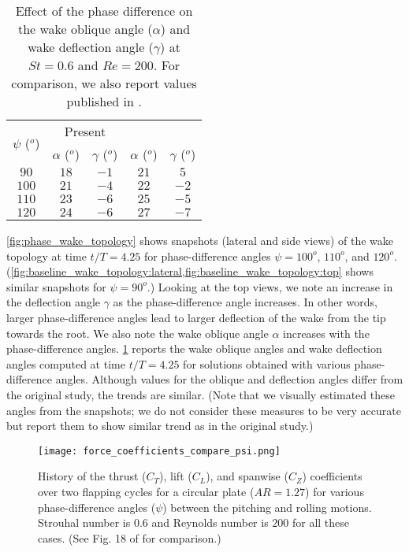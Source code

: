 \begin{table}[!h]
  \centering
  \begin{tabular}{ccccc}
    \hline\hline
    \multirow{2}{*}{$\psi$ ($^o$)} &
      \multicolumn{2}{c}{Present} &
      \multicolumn{2}{c}{\citet{li_dong_2016}} \\
    & $\alpha$ ($^o$) & $\gamma$ ($^o$) & $\alpha$ ($^o$) & $\gamma$ ($^o$) \\
    \hline
    $90$ & $18$ & $-1$ & $21$ & $5$ \\
    $100$ & $21$ & $-4$ & $22$ & $-2$ \\
    $110$ & $23$ & $-6$ & $25$ & $-5$ \\
    $120$ & $24$ & $-6$ & $27$ & $-7$ \\
    \hline\hline
  \end{tabular}
  \caption{Effect of the phase difference on the wake oblique angle ($\alpha$) and wake deflection angle ($\gamma$) at $St = 0.6$ and $Re = 200$. For comparison, we also report values published in \citet{li_dong_2016}.}
  \label{tab:phase_angles}
\end{table}

\cref{fig:phase_wake_topology} shows snapshots (lateral and side views) of the wake topology at time $t/T = 4.25$ for phase-difference angles $\psi = 100^o$, $110^o$, and $120^o$.
(\cref{fig:baseline_wake_topology:lateral,fig:baseline_wake_topology:top} shows similar snapshots for $\psi = 90^o$.)
Looking at the top views, we note an increase in the deflection angle $\gamma$ as the phase-difference angle increases.
In other words, larger phase-difference angles lead to larger deflection of the wake from the tip towards the root.
We also note the wake oblique angle $\alpha$ increases with the phase-difference angles.
\cref{tab:phase_angles} reports the wake oblique angles and wake deflection angles computed at time $t/T = 4.25$ for solutions obtained with various phase-difference angles.
Although values for the oblique and deflection angles differ from the original study, the trends are similar.
(Note that we visually estimated these angles from the snapshots; we do not consider these measures to be very accurate but report them to show similar trend as in the original study.)

\begin{figure}[!h]
  \centering
  \texttt{[image: force\_coefficients\_compare\_psi.png]}
  \caption{History of the thrust ($C_T$), lift ($C_L$), and spanwise ($C_Z$) coefficients over two flapping cycles for a circular plate ($AR = 1.27$) for various phase-difference angles ($\psi$) between the pitching and rolling motions. Strouhal number is $0.6$ and Reynolds number is $200$ for all these cases. (See Fig. 18 of \citet{li_dong_2016} for comparison.)}
  \label{fig:phase_force_coefficients}
\end{figure}

